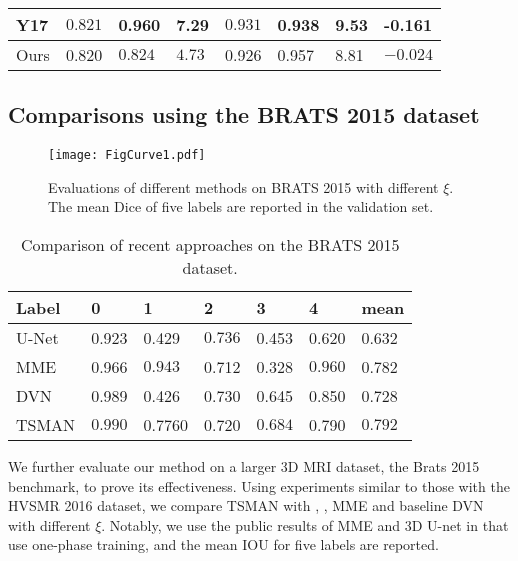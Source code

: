 \documentclass[letterpaper]{article} %
\begin{document}
\begin{table}[h]
\begin{center}
\begin{tabular}{p{0.5cm}|p{0.7cm}|p{0.7cm}|p{0.5cm}|p{0.7cm}|p{0.7cm}|p{0.5cm}|p{0.9cm}}
  \hline
  Y17&$\mathbf{0.821}$&0.960&7.29&$\mathbf{0.931}$&0.938&9.53&-0.161\\
  \hline
  Ours&0.820&$\mathbf{0.824}$&$\mathbf{4.73}$&0.926&0.957&8.81&$\mathbf{-0.024}$\\
  \hline
\end{tabular}
\end{center}
\end{table}\subsection{Comparisons using the BRATS 2015 dataset}\begin{figure}[t]
	\begin{center}
		\texttt{[image: FigCurve1.pdf]}
	\end{center}
	\caption{Evaluations of different methods on BRATS 2015 with different $\xi$. The mean Dice of five labels are reported in the validation set.}
	\label{fig:curve1}
\end{figure}\begin{table}[h]
\footnotesize
\begin{center}
\caption{Comparison of recent approaches on the BRATS 2015 dataset.}
\label{tab:brats}
\begin{tabular}{p{1cm}|p{0.7cm}|p{0.7cm}|p{0.7cm}|p{0.7cm}|p{0.7cm}|p{0.7cm}}
  \hline
  Label& 0&1&2&3&4&mean\\
  \hline
  \hline
  U-Net&0.923&0.429&$\mathbf{0.736}$&0.453&0.620&0.632\\

  MME&0.966&$\mathbf{0.943}$&0.712&0.328&$\mathbf{0.960}$&0.782\\
  DVN&0.989&0.426&0.730&0.645&0.850&0.728\\
  TSMAN&$\mathbf{0.990}$&0.7760&0.720&$\mathbf{0.684}$&0.790&$\mathbf{0.792}$\\
  \hline
\end{tabular}
\end{center}
\end{table}
We further evaluate our method on a larger 3D MRI dataset, the Brats 2015 benchmark, to prove its effectiveness.
Using experiments similar to those with the HVSMR 2016 dataset, we compare TSMAN with \cite{NIPS2017_6697}, \cite{Jagersand2017}, MME \cite{Tseng_2017_CVPR} and baseline DVN\cite{Yu2017} with different $\xi$.
Notably, we use the public results of MME and 3D U-net in \cite{Tseng_2017_CVPR} that use one-phase training, and the mean IOU for five labels are reported.
\end{document}
